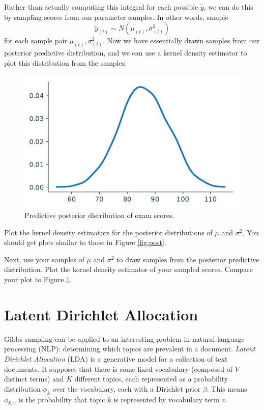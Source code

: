 Rather than actually computing this integral for each possible $\tilde{y}$, we can do this by sampling scores from our parameter samples. In other words, sample
\begin{equation*}
\tilde{y}_{(t)} \sim N(\mu_{(t)}, \sigma_{(t)}^{2})
\end{equation*}
for each sample pair $\mu_{(t)}, \sigma_{(t)}^{2}$. Now we have essentially drawn samples from our posterior predictive distribution, and we can use a kernel density estimator to plot this distribution from the samples.

\begin{figure}[H]
    \includegraphics[width=.7\textwidth]{figures/predictiveposterior.pdf}
    \caption{Predictive posterior distribution of exam scores.}
    \label{fig:predictive}
\end{figure}

\begin{problem} %
Plot the kernel density estimators for the posterior distributions of $\mu$ and $\sigma^{2}$.
You should get plots similar to those in Figure \ref{fig:post}.

Next, use your samples of $\mu$ and $\sigma^{2}$ to draw samples from the posterior predictive distribution.
Plot the kernel density estimator of your sampled scores.
Compare your plot to Figure \ref{fig:predictive}.
\end{problem}

\section*{Latent Dirichlet Allocation}

Gibbs sampling can be applied to an interesting problem in natural language processing (NLP): determining which topics are prevalent in a document.
\emph{Latent Dirichlet Allocation} (LDA) is a generative model for a collection of text documents.
It supposes that there is some fixed vocabulary (composed of $V$ distinct terms) and $K$ different topics, each represented as a probability distribution $\phi_{k}$ over the vocabulary, each with a Dirichlet prior $\beta$.
This means $\phi_{k,v}$ is the probability that topic $k$ is represented by vocabulary term $v$.

